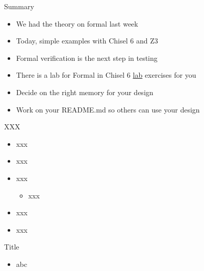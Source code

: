 \begin{frame}[fragile]{Summary}
\begin{itemize}
\item We had the theory on formal last week
\item Today, simple examples with Chisel 6 and Z3
\item Formal verification is the next step in testing
\item There is a lab for Formal in Chisel 6 \href{https://github.com/schoeberl/agile-hw/tree/main/lab8}{lab} exercises for you
\item Decide on the right memory for your design 
\item Work on your README.md so others can use your design
\end{itemize}
\end{frame}




\begin{frame}[fragile]{XXX}
\begin{itemize}
\item xxx
\item xxx
\item xxx
\begin{itemize}
\item xxx
\end{itemize}
\item xxx
\item xxx
\end{itemize}
\end{frame}

\begin{frame}[fragile]{Title}
\begin{itemize}
\item abc
\end{itemize}
\end{frame}
